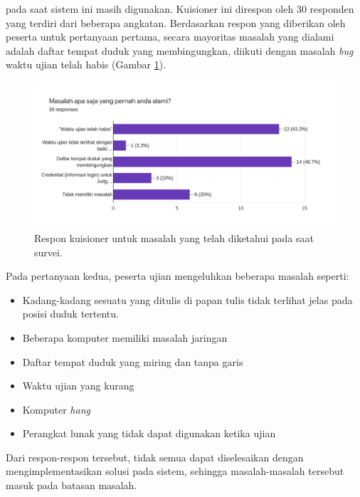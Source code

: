     pada saat sistem ini masih digunakan. Kuisioner ini direspon oleh 30
    responden yang terdiri dari beberapa angkatan. Berdasarkan respon yang
    diberikan oleh peserta untuk pertanyaan pertama, secara mayoritas masalah
    yang dialami adalah daftar tempat duduk yang membingungkan, diikuti dengan
    masalah \textit{bug} waktu ujian telah habis (Gambar
    \ref{fig:kuisioner-student-1}).
    \begin{figure}
        \centering
        \includegraphics[width=0.7\paperwidth]{Gambar/survey-student.pdf}
        \caption{Respon kuisioner untuk masalah yang telah diketahui pada saat survei.}
        \label{fig:kuisioner-student-1}
    \end{figure}

    Pada pertanyaan kedua, peserta ujian mengeluhkan beberapa masalah seperti:
    \begin{itemize}
        \item Kadang-kadang sesuatu yang ditulis di papan tulis tidak terlihat
        jelas pada posisi duduk tertentu.
        
        \item Beberapa komputer memiliki masalah jaringan
        
        \item Daftar tempat duduk yang miring dan tanpa garis
        
        \item Waktu ujian yang kurang
        
        \item Komputer \textit{hang}
        
        \item Perangkat lunak yang tidak dapat digunakan ketika ujian
    \end{itemize}
    Dari respon-respon tersebut, tidak semua dapat diselesaikan dengan
    mengimplementasikan solusi pada sistem, sehingga masalah-masalah tersebut
    masuk pada batasan masalah.

